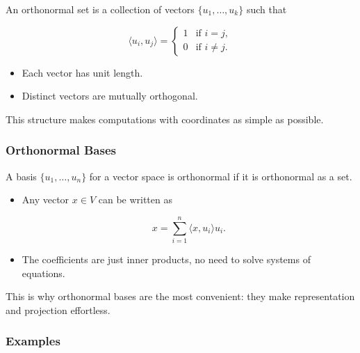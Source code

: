 \documentclass[
  letterpaper,
  DIV=11,
  numbers=noendperiod]{scrreprt}
\providecommand{\tightlist}{%
  \setlength{\itemsep}{0pt}\setlength{\parskip}{0pt}}
\begin{document}
An orthonormal set is a collection of vectors \(\{u_1, \dots, u_k\}\)
such that

\[
\langle u_i, u_j \rangle = \begin{cases} 
1 & \text{if } i=j, \\ 
0 & \text{if } i \neq j.  
\end{cases}
\]

\begin{itemize}
\tightlist
\item
  Each vector has unit length.
\item
  Distinct vectors are mutually orthogonal.
\end{itemize}

This structure makes computations with coordinates as simple as
possible.

\subsubsection{Orthonormal Bases}\label{orthonormal-bases}

A basis \(\{u_1, \dots, u_n\}\) for a vector space is orthonormal if it
is orthonormal as a set.

\begin{itemize}
\item
  Any vector \(x \in V\) can be written as

  \[
  x = \sum_{i=1}^n \langle x, u_i \rangle u_i.
  \]
\item
  The coefficients are just inner products, no need to solve systems of
  equations.
\end{itemize}

This is why orthonormal bases are the most convenient: they make
representation and projection effortless.

\subsubsection{Examples}\label{examples-3}
\end{document}
